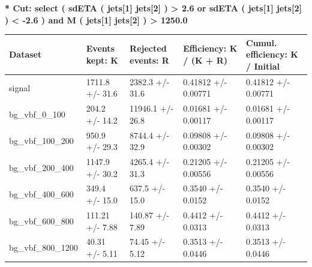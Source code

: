 \documentclass[a4paper, 10pt]{article}
\begin{document}
\textbf{* Cut: select ( sdETA ( jets[1] jets[2] ) > 2.6 or sdETA ( jets[1] jets[2] ) < -2.6 ) and M ( jets[1] jets[2] ) > 1250.0}\\
   \begin{table}[H]
  \begin{center}
    \begin{tabular}{|m{20.0mm}|m{27.0mm}|m{27.0mm}|m{33.0mm}|m{32.0mm}|}
      \hline
      {\cellcolor{yellow}         Dataset}& {\cellcolor{yellow}         Events kept:
          K}& {\cellcolor{yellow}         Rejected events:
          R}& {\cellcolor{yellow}         Efficiency:
          K /\- (K + R)}& {\cellcolor{yellow}         Cumul. efficiency:
          K /\- Initial}\\
      \hline
      {\cellcolor{white}         signal}& {\cellcolor{white}         1711.8 +/\-- 31.6}& {\cellcolor{white}         2382.3 +/\-- 31.6}& {\cellcolor{white}         0.41812 +/\-- 0.00771}& {\cellcolor{white}         0.41812 +/\-- 0.00771}\\
      \hline
      {\cellcolor{white}         bg\_vbf\_0\_100}& {\cellcolor{white}         204.2 +/\-- 14.2}& {\cellcolor{white}         11946.1 +/\-- 26.8}& {\cellcolor{white}         0.01681 +/\-- 0.00117}& {\cellcolor{white}         0.01681 +/\-- 0.00117}\\
      \hline
      {\cellcolor{white}         bg\_vbf\_100\_200}& {\cellcolor{white}         950.9 +/\-- 29.3}& {\cellcolor{white}         8744.4 +/\-- 32.9}& {\cellcolor{white}         0.09808 +/\-- 0.00302}& {\cellcolor{white}         0.09808 +/\-- 0.00302}\\
      \hline
      {\cellcolor{white}         bg\_vbf\_200\_400}& {\cellcolor{white}         1147.9 +/\-- 30.2}& {\cellcolor{white}         4265.4 +/\-- 31.3}& {\cellcolor{white}         0.21205 +/\-- 0.00556}& {\cellcolor{white}         0.21205 +/\-- 0.00556}\\
      \hline
      {\cellcolor{white}         bg\_vbf\_400\_600}& {\cellcolor{white}         349.4 +/\-- 15.0}& {\cellcolor{white}         637.5 +/\-- 15.0}& {\cellcolor{white}         0.3540 +/\-- 0.0152}& {\cellcolor{white}         0.3540 +/\-- 0.0152}\\
      \hline
      {\cellcolor{white}         bg\_vbf\_600\_800}& {\cellcolor{white}         111.21 +/\-- 7.88}& {\cellcolor{white}         140.87 +/\-- 7.89}& {\cellcolor{white}         0.4412 +/\-- 0.0313}& {\cellcolor{white}         0.4412 +/\-- 0.0313}\\
      \hline
      {\cellcolor{white}         bg\_vbf\_800\_1200}& {\cellcolor{white}         40.31 +/\-- 5.11}& {\cellcolor{white}         74.45 +/\-- 5.12}& {\cellcolor{white}         0.3513 +/\-- 0.0446}& {\cellcolor{white}         0.3513 +/\-- 0.0446}\\

\end{tabular}
\end{center}
\end{table}
\end{document}
